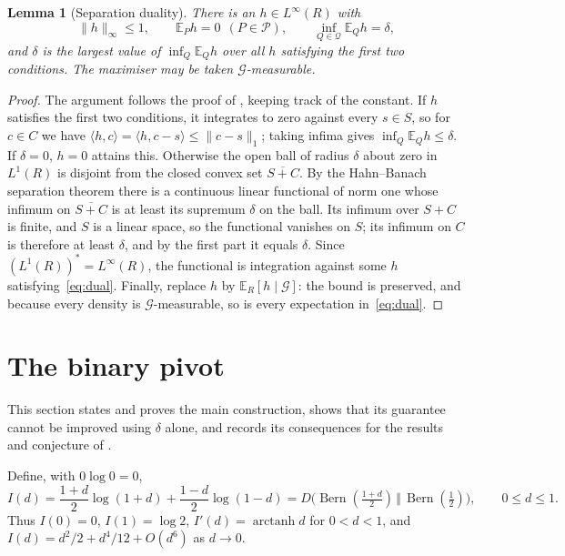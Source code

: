 \documentclass[11pt,a4paper]{article}
\newtheorem{lemma}[theorem]{Lemma}
\theoremstyle{definition}
\theoremstyle{remark}
\newcommand{\PP}{\mathcal P}
\newcommand{\QQ}{\mathcal Q}
\newcommand{\EE}{\mathbb E}
\newcommand{\Bern}{\operatorname{Bern}}
\DeclareMathOperator{\arctanh}{arctanh}
\begin{document}
\begin{lemma}[Separation duality]\label{lem:dual}
There is an \(h\in L^\infty(R)\) with
\begin{equation}\label{eq:dual}
 \|h\|_\infty\le1,\qquad \EE_Ph=0\ \ (P\in\PP),\qquad \inf_{Q\in\QQ}\EE_Qh=\delta,
\end{equation}
and \(\delta\) is the largest value of \(\inf_Q\EE_Qh\) over all \(h\) satisfying the first two conditions. The maximiser may be taken \(\mathcal G\)-measurable.
\end{lemma}
\begin{proof}
The argument follows the proof of \cite[Theorem~6.8]{ZRW}, keeping track of the constant. If \(h\) satisfies the first two conditions, it integrates to zero against every \(s\in S\), so for \(c\in C\) we have \(\langle h,c\rangle=\langle h,c-s\rangle\le\|c-s\|_1\); taking infima gives \(\inf_Q\EE_Qh\le\delta\). If \(\delta=0\), \(h=0\) attains this. Otherwise the open ball of radius \(\delta\) about zero in \(L^1(R)\) is disjoint from the closed convex set \(\overline{S+C}\). By the Hahn--Banach separation theorem there is a continuous linear functional of norm one whose infimum on \(\overline{S+C}\) is at least its supremum \(\delta\) on the ball. Its infimum over \(S+C\) is finite, and \(S\) is a linear space, so the functional vanishes on \(S\); its infimum on \(C\) is therefore at least \(\delta\), and by the first part it equals \(\delta\). Since \((L^1(R))^*=L^\infty(R)\), the functional is integration against some \(h\) satisfying~\eqref{eq:dual}. Finally, replace \(h\) by \(\EE_R[h\mid\mathcal G]\): the bound is preserved, and because every density is \(\mathcal G\)-measurable, so is every expectation in~\eqref{eq:dual}.
\end{proof}

\section{The binary pivot}\label{sec:binary}

This section states and proves the main construction, shows that its guarantee cannot be improved using \(\delta\) alone, and records its consequences for the results and conjecture of \cite{ZRW}.

Define, with \(0\log0=0\),
\begin{equation}\label{eq:I}
 I(d)=\frac{1+d}{2}\log(1+d)+\frac{1-d}{2}\log(1-d)=D\bigl(\Bern(\tfrac{1+d}2)\,\big\Vert\,\Bern(\tfrac12)\bigr),\qquad 0\le d\le1 .
\end{equation}
Thus \(I(0)=0\), \(I(1)=\log2\), \(I'(d)=\arctanh d\) for \(0<d<1\), and \(I(d)=d^2/2+d^4/12+O(d^6)\) as \(d\to0\).
\end{document}
